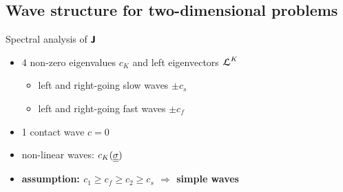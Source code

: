 
\subsection{Wave structure for two-dimensional problems}

\begin{frame}
  \begin{block}{Spectral analysis of $\boldsymbol{\mathsf{J}}$}
    \begin{itemize}
    \item 4 non-zero eigenvalues $c_K$ and left eigenvectors ${\boldsymbol{\mathcal{L}}}^K$ 
      \begin{itemize}
      \item[] left and right-going slow waves $\pm c_s$
      \item[] left and right-going fast waves $\pm c_f$
      \end{itemize}
    \item 1 contact wave $c=0$
    \item non-linear waves: $c_K({\underline{\underline{\sigma}}})$ %
    \item \textbf{assumption: $c_1 \geq c_f \geq c_2 \geq c_s$ $\Rightarrow$ simple waves}
    \end{itemize}
  \end{block}
\end{frame}



